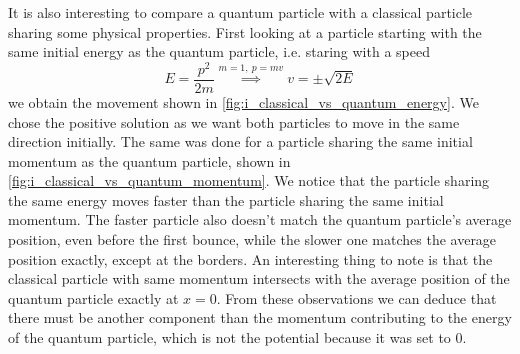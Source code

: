 It is also interesting to compare a quantum particle with a classical particle sharing some physical properties. First looking at a particle starting with the same initial energy as the quantum particle, i.e. staring with a speed
\begin{equation}
    E = \frac{p^2}{2m} \stackrel{m=1,\ p=mv}{\implies} v = \pm \sqrt{2E}
\end{equation}
we obtain the movement shown in \autoref{fig:i_classical_vs_quantum_energy}. We chose the positive solution as we want both particles to move in the same direction initially. The same was done for a particle sharing the same initial momentum as the quantum particle, shown in \autoref{fig:i_classical_vs_quantum_momentum}. We notice that the particle sharing the same energy moves faster than the particle sharing the same initial momentum. The faster particle also doesn't match the quantum particle's average position, even before the first bounce, while the slower one matches the average position exactly, except at the borders. An interesting thing to note is that the classical particle with same momentum intersects with the average position of the quantum particle exactly at \(x=0\). From these observations we can deduce that there must be another component than the momentum contributing to the energy of the quantum particle, which is not the potential because it was set to 0.


